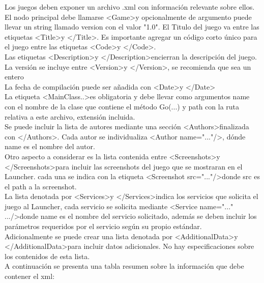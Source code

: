 \documentclass[language=spanish]{article}
\begin{document}
Los juegos deben exponer un archivo .xml con información relevante sobre ellos.
El nodo principal debe llamarse \textless Game\textgreater y opcionalmente de argumento puede llevar un string llamado version con el valor "1.0".
El Titulo del juego va entre las etiquetas \textless Title\textgreater y \textless /Title\textgreater. Es importante agregar un código corto único para el juego entre las etiquetas \textless Code\textgreater y \textless /Code\textgreater.\\
Las etiquetas \textless Description\textgreater y \textless /Description\textgreater encierran la descripción del juego.\\
La versión se incluye entre \textless Version\textgreater y \textless /Version\textgreater , se recomienda que sea un entero\\
La fecha de compilación puede ser añadida con \textless Date\textgreater  y \textless /Date\textgreater \\
La etiqueta \textless MainClass..\textgreater  es obligatoria y debe llevar como argumentos name con el nombre de la clase que contiene el método Go(...) y path con la ruta relativa a este archivo, extensión incluida.\\
Se puede incluir la lista de autores mediante una sección \textless Authors\textgreater  finalizada con \textless /Authors\textgreater . Cada autor se individualiza \textless Author name="..."/\textgreater , dónde name es el nombre del autor.\\
Otro aspecto a considerar es la lista contenida entre \textless Screenshots\textgreater  y \textless /Screenshots\textgreater  para incluir las screenshots del juego que se mostraran en el Launcher. cada una se indica con la etiqueta \textless Screenshot src="..."/\textgreater  donde src es el path a la screenshot.\\
La lista denotada por \textless Services\textgreater y \textless /Services\textgreater  indica los servicios que solicita el juego al Launcher, cada servicio se solicita mediante \textless Service name="..." .../\textgreater  donde name es el nombre del servicio solicitado, además se deben incluir los parámetros requeridos por el servicio según su propio estándar.\\
Adicionalmente se puede crear una lista denotada por \textless AdditionalData\textgreater  y \textless /AdditionalData\textgreater  para incluir datos adicionales. No hay especificaciones sobre los contenidos de esta lista.\\ 
A continuación se presenta una tabla resumen sobre la información que debe contener el xml:
\end{document}
